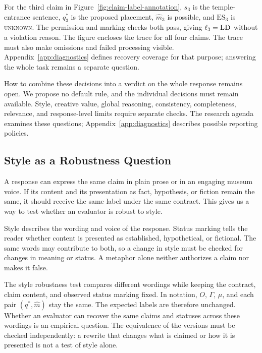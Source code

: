 \documentclass{clv2025}
\newcommand{\LD}{\textsc{LD}}
\begin{document}
For the third claim in Figure~\ref{fig:claim-label-annotation}, $s_3$ is the
temple-entrance sentence, $q_3^*$ is the proposed placement,
$\widehat{m}_3$ is possible, and $\mathrm{ES}_3$ is \textsc{unknown}.
The permission and marking checks both pass, giving $\ell_3=\LD$ without
a violation reason. The figure encloses the trace for all four claims.
The trace must also make omissions and failed processing visible.
Appendix~\ref{app:diagnostics} defines recovery coverage for that purpose;
answering the whole task remains a separate question.

How to combine these decisions into a verdict on the whole response remains
open. We propose no default rule, and the individual decisions must remain
available. Style, creative value, global reasoning, consistency, completeness,
relevance, and response-level limits require separate checks. The research
agenda examines these questions; Appendix~\ref{app:diagnostics} describes
possible reporting policies.

\subsection{Style as a Robustness Question}\label{subsec:style}

A response can express the same claim in plain prose or in an engaging
museum voice. If its content and its presentation as fact, hypothesis, or
fiction remain the same, it should receive the same label under the same
contract. This gives us a way to test whether an evaluator is robust to style.

Style describes the wording and voice of the response. Status marking tells
the reader whether content is presented as established, hypothetical, or
fictional. The same words may contribute to both, so a change in style must
be checked for changes in meaning or status. A metaphor alone neither
authorizes a claim nor makes it false.

The style robustness test compares different wordings while keeping the contract, claim
content, and observed status marking fixed. In notation, $O$, $\Gamma$,
$\mu$, and each pair $(q^*,\widehat{m})$ stay the same. The expected labels
are therefore unchanged. Whether an evaluator can recover the same claims
and statuses across these wordings is an empirical question. The equivalence
of the versions must be checked independently: a rewrite that changes what
is claimed or how it is presented is not a test of style alone.
\end{document}
